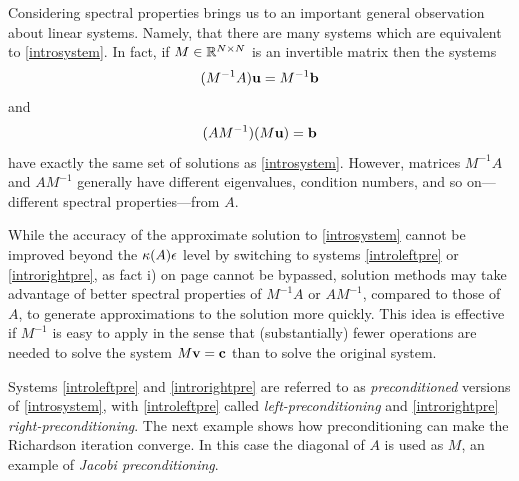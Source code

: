 Considering spectral properties brings us to an important general observation about linear systems.  Namely, that there are many systems which are equivalent to \eqref{introsystem}.  In fact, if $M\in\mathbb{R}^{N\times N}$ is an invertible matrix then the systems
\begin{equation}
(M^{-1} A) \mathbf{u} = M^{-1} \mathbf{b} \label{introleftpre}
\end{equation}
and
\begin{equation}
(A M^{-1}) (M\mathbf{u}) = \mathbf{b} \label{introrightpre}
\end{equation}
have exactly the same set of solutions as \eqref{introsystem}.  However, matrices $M^{-1} A$ and $A M^{-1}$ generally have different eigenvalues, condition numbers, and so on---different spectral properties---from $A$.

While the accuracy of the approximate solution to \eqref{introsystem} cannot be improved beyond the $\kappa(A) \epsilon$ level by switching to systems \eqref{introleftpre} or \eqref{introrightpre}, as fact i) on page \pageref{limittoaccuracy} cannot be bypassed, solution methods may take advantage of better spectral properties of $M^{-1} A$ or $A M^{-1}$, compared to those of $A$, to generate approximations to the solution more quickly.  This idea is effective if $M^{-1}$ is easy to apply in the sense that (substantially) fewer operations are needed to solve the system $M\mathbf{v}=\mathbf{c}$ than to solve the original system.

Systems \eqref{introleftpre} and \eqref{introrightpre} are referred to as \emph{preconditioned} versions of \eqref{introsystem}, with \eqref{introleftpre} called \emph{left-preconditioning} and \eqref{introrightpre} \emph{right-preconditioning}.  The next example shows how preconditioning can make the Richardson iteration converge.  In this case the diagonal of $A$ is used as $M$, an example of \emph{Jacobi preconditioning}.

